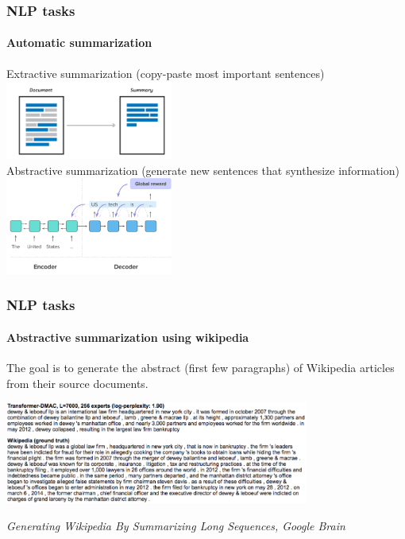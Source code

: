 \documentclass[9pt]{beamer}
\begin{document}
\begin{frame}
  \frametitle{NLP tasks}

  \framesubtitle{Automatic summarization}

  \begin{center}
    Extractive summarization (copy-paste most important sentences)\\[.3cm]
    \includegraphics[width = 5.5cm]{images/extractive_summarization.png} \\[.5cm]
    Abstractive summarization (generate new sentences that synthesize information)\\[.3cm]
    \includegraphics[width = 5.5cm]{images/abstractive_summarization.png}
  \end{center}
\end{frame}

\begin{frame}
  \frametitle{NLP tasks}

  \framesubtitle{Abstractive summarization using wikipedia}

  The goal is to generate the abstract (first few paragraphs) of
  Wikipedia articles from their source documents.

  \begin{center}
    \includegraphics[width = 10cm]{images/wikipedia_summarization.png}
  \end{center}

  \bigskip

  {\footnotesize \textit{Generating Wikipedia By Summarizing Long
      Sequences, Google Brain}}
\end{frame}
\end{document}
